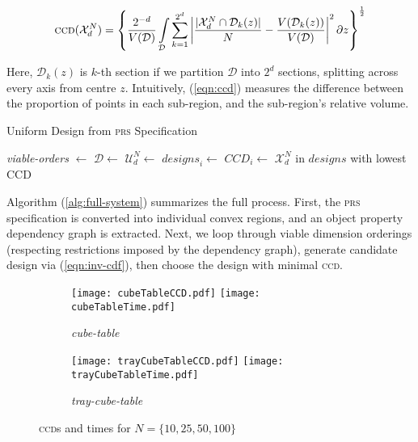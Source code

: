 \documentclass[sigplan, screen]{acmart} %
\newcommand{\expD}{\mathcal{X}^{N}_d}
\newcommand{\uniD}{\mathcal{U}^{N}_d}
\begin{document}
\begin{equation}
    \textsc{ccd}(\expD) = \left\{ \frac{2^{-d}}{V(\mathcal{D})} \int\limits_{\mathcal{D}}\sum^{2^d}_{k=1} \left\lvert \frac{|\expD \cap \mathcal{D}_k(z)|}{N} - \frac{V(\mathcal{D}_k(z))}{V(\mathcal{D})} \right\rvert^2 \partial z \right\}^{\frac{1}{2}}
    \label{eqn:ccd}
\end{equation}

Here, $\mathcal{D}_k(z)$ is $k$-th section if we partition $\mathcal{D}$ into $2^d$ sections, splitting across every axis from centre $z$. Intuitively, (\ref{eqn:ccd}) measures the difference between the proportion of points in each sub-region, and the sub-region's relative volume.

\begin{algorithm}
        \caption{Uniform Design from \textsc{prs} Specification}
        \label{alg:full-system}
        \begin{algorithmic}[1]
            \State \textit{viable-orders} $\gets$ 
            \State $\mathcal{D} \gets$ 
            \State $\uniD \gets$ 
                \State $\textit{designs}_i \gets$ \Call{Inverse-Rosenblatt}{$\uniD$, \textit{d-order}}
                \State $CCD_i \gets$ 
            \EndFor
            \State \Return $\expD$ in $\textit{designs}$ with lowest CCD
        \EndFunction
        \end{algorithmic}
\end{algorithm}

Algorithm (\ref{alg:full-system}) summarizes the full process. First, the \textsc{prs} specification is converted into individual convex regions, and an object property dependency graph is extracted. Next, we loop through viable dimension orderings (respecting restrictions imposed by the dependency graph), generate candidate design via (\ref{eqn:inv-cdf}), then choose the design with minimal \textsc{ccd}. 

\begin{figure}
\centering
\begin{subfigure}{\linewidth}
\centering
    \caption{\emph{cube-table}}
    \texttt{[image: cubeTableCCD.pdf]}
    \texttt{[image: cubeTableTime.pdf]}
    \label{fig:experiment:cube-table}
\end{subfigure}

\begin{subfigure}{\linewidth}
    \centering
    \caption{\emph{tray-cube-table}}
    \texttt{[image: trayCubeTableCCD.pdf]}
    \texttt{[image: trayCubeTableTime.pdf]}
    \label{fig:experiment:tray-cube-table}
\end{subfigure}
\caption{\textsc{ccd}s and times for $N=\{10, 25, 50, 100\}$}
\label{fig:experiment}
\end{figure}
\end{document}
